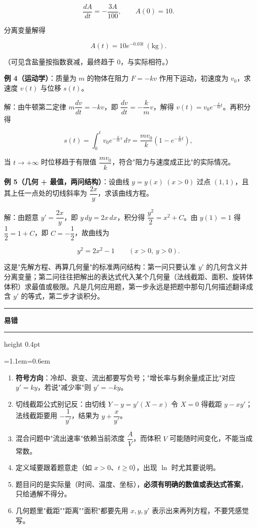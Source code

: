 \documentclass[11pt,openany,UTF8]{ctexbook}
\newcommand{\callouthead}[2]{%
  \par\addvspace{7pt}\noindent
  {\color{#1}\rule[-0.15em]{3pt}{1.05em}}\hspace{0.5em}%
  {\bfseries\color{#1}#2}\par\nobreak\vspace{-0.35em}%
  {\color{rulesep}\hrule height 0.4pt}\nobreak\vspace{0.45em}%
  \begingroup\small\setlength{\parindent}{0pt}%
  \leftskip=1.1em\rightskip=0.6em\noindent\ignorespaces}
\newcommand{\calloutend}{\par\endgroup\addvspace{7pt}}
\newenvironment{callwarn}[1]{\callouthead{warnbar}{#1}}{\calloutend}
\begin{document}
\[\frac{dA}{dt}=-\frac{3A}{100},\qquad A(0)=10 .\]

分离变量解得

\[A(t)=10e^{-0.03t}\ (\mathrm{kg}).\]

（可见含盐量按指数衰减，最终趋于 $0$，与实际相符。）

\textbf{例 4（运动学）}：质量为 $m$ 的物体在阻力 $F=-kv$ 作用下运动，初速度为 $v_0$，求速度 $v(t)$ 与位移 $s(t)$。

解：由牛顿第二定律 $m\dfrac{dv}{dt}=-kv$，即 $\dfrac{dv}{dt}=-\dfrac km v$，解得 $v(t)=v_0e^{-\frac km t}$。再积分得

\[s(t)=\int_0^{t}v_0e^{-\frac km \tau}\,d\tau=\frac{mv_0}{k}\left(1-e^{-\frac km t}\right),\]

当 $t\to+\infty$ 时位移趋于有限值 $\dfrac{mv_0}{k}$，符合"阻力与速度成正比"的实际情况。

\textbf{例 5（几何 + 最值，两问结构）}：设曲线 $y=y(x)\;(x>0)$ 过点 $(1,1)$，且其上任一点处的切线斜率为 $\dfrac{2x}{y}$，求该曲线方程。

解：由题意 $y'=\dfrac{2x}{y}$，即 $y\,dy=2x\,dx$，积分得 $\dfrac{y^{2}}{2}=x^{2}+C$。由 $y(1)=1$ 得 $\dfrac12=1+C$，即 $C=-\dfrac12$，故曲线为

\[y^{2}=2x^{2}-1\qquad (x>0,\ y>0).\]

这是"先解方程、再算几何量"的标准两问结构：第一问只要认准 $y'$ 的几何含义并分离变量；第二问往往把解出的表达式代入某个几何量（法线截距、面积、旋转体体积）求最值或极限。凡是几何应用题，第一步永远是把题中那句几何描述翻译成含 $y'$ 的等式，第二步才谈积分。

\begin{callwarn}{易错}
\begin{enumerate}
\item \textbf{符号方向}：冷却、衰变、流出都要写负号；"增长率与剩余量成正比"对应 $y'=ky$，若说"减少率"则 $y'=-ky$。
\item 切线截距公式别记反：由切线 $Y-y=y'(X-x)$ 令 $X=0$ 得截距 $y-xy'$；法线截距要用 $-\dfrac1{y'}$，结果为 $y+\dfrac{x}{y'}$。
\item 混合问题中"流出速率"依赖当前浓度 $\dfrac AV$，而体积 $V$ 可能随时间变化，不能当成常数。
\item 定义域要跟着题意走（如 $x>0$、$t\ge 0$），出现 $\ln$ 时尤其要说明。
\item 题目问的是实际量（时间、温度、坐标），\textbf{必须有明确的数值或表达式答案}，只给通解不得分。
\item 几何题里"截距""距离""面积"都要先用 $x,y,y'$ 表示出来再列方程，不要凭感觉写。
\end{enumerate}
\end{callwarn}
\end{document}
